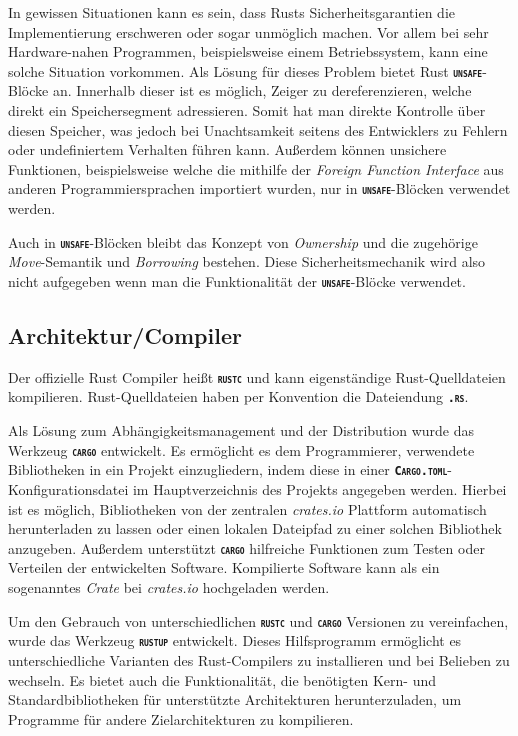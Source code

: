 In gewissen Situationen kann es sein, dass Rusts Sicherheitsgarantien die Implementierung erschweren oder
sogar unmöglich machen. Vor allem bei sehr Hardware-nahen Programmen, beispielsweise einem Betriebssystem,
kann eine solche Situation vorkommen. Als Lösung für dieses Problem bietet Rust
\texttt{\textsc{\textbf{unsafe}}}-Blöcke an. Innerhalb dieser ist es möglich, Zeiger zu dereferenzieren, welche
direkt ein Speichersegment adressieren. Somit hat man direkte Kontrolle über diesen Speicher, was
jedoch bei Unachtsamkeit seitens des Entwicklers zu Fehlern oder undefiniertem Verhalten führen kann.
Außerdem können unsichere Funktionen, beispielsweise welche die mithilfe der
\textit{Foreign Function Interface} aus anderen Programmiersprachen importiert wurden,
nur in \texttt{\textsc{\textbf{unsafe}}}-Blöcken verwendet werden.

Auch in \texttt{\textsc{\textbf{unsafe}}}-Blöcken bleibt das Konzept von \textit{Ownership} und die zugehörige
\textit{Move}-Semantik und \textit{Borrowing} bestehen. Diese Sicherheitsmechanik wird also nicht aufgegeben
wenn man die Funktionalität der \texttt{\textsc{\textbf{unsafe}}}-Blöcke verwendet.

\subsection{Architektur/Compiler}

Der offizielle Rust Compiler heißt \texttt{\textsc{\textbf{rustc}}} und kann eigenständige Rust-Quelldateien
kompilieren. Rust-Quelldateien haben per Konvention die Dateiendung \texttt{\textsc{\textbf{.rs}}}.\cite{rustBook}

Als Lösung zum Abhängigkeitsmanagement und der Distribution wurde das Werkzeug \texttt{\textsc{\textbf{cargo}}} 
entwickelt. Es ermöglicht es dem Programmierer, verwendete Bibliotheken in ein Projekt einzugliedern,
indem diese in einer \texttt{\textsc{\textbf{Cargo.toml}}}-Konfigurationsdatei im Hauptverzeichnis
des Projekts angegeben werden. Hierbei ist es möglich, Bibliotheken von der zentralen \textit{crates.io}
Plattform automatisch herunterladen zu lassen oder einen lokalen Dateipfad zu einer solchen
Bibliothek anzugeben.
Außerdem unterstützt \texttt{\textsc{\textbf{cargo}}} hilfreiche Funktionen zum Testen oder
Verteilen der entwickelten Software. Kompilierte Software kann als ein sogenanntes \textit{Crate} bei
\textit{crates.io} hochgeladen werden.\cite{rustBook}

Um den Gebrauch von unterschiedlichen \texttt{\textsc{\textbf{rustc}}} und \texttt{\textsc{\textbf{cargo}}} Versionen 
zu vereinfachen, wurde das Werkzeug \texttt{\textsc{\textbf{rustup}}} entwickelt. Dieses
Hilfsprogramm ermöglicht es unterschiedliche Varianten des Rust-Compilers zu installieren und bei Belieben zu
wechseln. Es bietet auch die Funktionalität, die benötigten Kern- und Standardbibliotheken für unterstützte
Architekturen herunterzuladen, um Programme für andere Zielarchitekturen zu kompilieren.\cite{rustupRepo}

